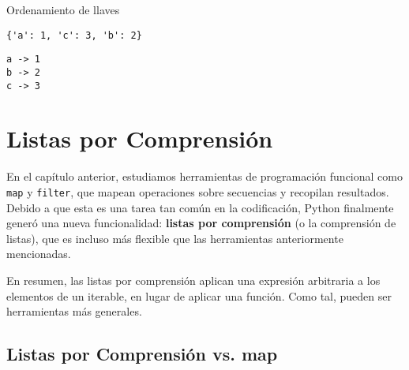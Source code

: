 \begin{code} Ordenamiento de llaves 

\begin{Shaded}
\begin{Highlighting}[]
\end{Highlighting}
\end{Shaded}

\begin{verbatim}
{'a': 1, 'c': 3, 'b': 2}
\end{verbatim}

\begin{Shaded}
\begin{Highlighting}[]
 
    \NormalTok{(}\SpecialCharTok{\{}\SpecialCharTok{\}}\SpecialStringTok{ {-}\textgreater{} }\SpecialCharTok{\{}\SpecialCharTok{\}}\SpecialStringTok{\textquotesingle{}}\NormalTok{)}
\end{Highlighting}
\end{Shaded}

\begin{verbatim}
a -> 1
b -> 2
c -> 3
\end{verbatim}
\end{code}

\section{Listas por Comprensión}

En el capítulo anterior, estudiamos herramientas de programación
funcional como \texttt{map} y \texttt{filter}, que mapean operaciones
sobre secuencias y recopilan resultados. Debido a que esta es una tarea
tan común en la codificación, Python finalmente generó una nueva
funcionalidad: \textbf{listas por comprensión} (o la comprensión de
listas), que es incluso más flexible que las herramientas anteriormente
mencionadas.

En resumen, las listas por comprensión aplican una expresión arbitraria
a los elementos de un iterable, en lugar de aplicar una función. Como
tal, pueden ser herramientas más generales.

\subsection{Listas por Comprensión vs. map}

